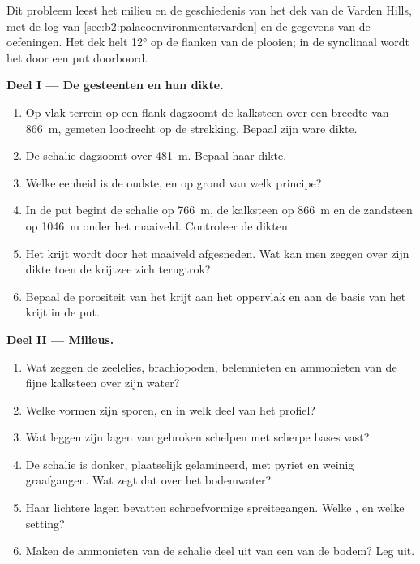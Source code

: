 \begin{problem}\label{pb:b2:palaeoenvironments:1}
Dit probleem leest het milieu en de geschiedenis van het dek van de Varden Hills, met de log van
\cref{sec:b2:palaeoenvironments:varden} en de gegevens van de oefeningen. Het dek helt
\ang{12} op de flanken van de plooien; in de synclinaal wordt het door een put doorboord.

\medskip\noindent\textbf{Deel I --- De gesteenten en hun dikte.}
\begin{enumerate}
  \item Op vlak terrein op een flank dagzoomt de kalksteen over een breedte van \qty{866}{m}, gemeten
        loodrecht op de strekking. Bepaal zijn ware dikte.
  \item De schalie dagzoomt over \qty{481}{m}. Bepaal haar dikte.
  \item Welke eenheid is de oudste, en op grond van welk principe?
  \item In de put begint de schalie op \qty{766}{m}, de kalksteen op \qty{866}{m} en de
        zandsteen op \qty{1046}{m} onder het maaiveld. Controleer de dikten.
  \item Het krijt wordt door het maaiveld afgesneden. Wat kan men zeggen over zijn dikte toen de
        krijtzee zich terugtrok?
  \item Bepaal de porositeit van het krijt aan het oppervlak en aan de basis van het krijt in de put.
\end{enumerate}

\medskip\noindent\textbf{Deel II --- Milieus.}
\begin{enumerate}[resume]
  \item Wat zeggen de zeelelies, brachiopoden, belemnieten en ammonieten van de fijne kalksteen
        over zijn water?
  \item Welke  vormen zijn sporen, en in welk deel van het profiel?
  \item Wat leggen zijn lagen van gebroken schelpen met scherpe bases vast?
  \item De schalie is donker, plaatselijk gelamineerd, met pyriet en weinig graafgangen. Wat zegt dat
        over het bodemwater?
  \item Haar lichtere lagen bevatten schroefvormige spreitegangen. Welke , en welke setting?
  \item Maken de ammonieten van de schalie deel uit van een  van de bodem? Leg uit.
\end{enumerate}


\end{problem}
